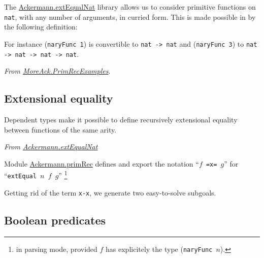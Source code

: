 The  \href{../theories/html/hydras.Ackermann.extEqualNat.html}{Ackermann.extEqualNat}
 library allows us to consider primitive functions on \texttt{nat}, with any number of arguments, in curried form. This is made possible in 
by the following definition:



For instance (\texttt{naryFunc 1}) is convertible to \texttt{nat -> nat} and (\texttt{naryFunc 3})
to \texttt{nat -> nat -> nat -> nat}.

\vspace{4pt}
\noindent
\emph{From \href{../theories/html/hydras.MoreAck.PrimRecExamples.html}{MoreAck.PrimRecExamples}}.





\subsection{Extensional equality}

Dependent types make it possible to define recursively extensional equality between functions of the same arity.

\vspace{4pt}
\noindent
\emph{From \href{../theories/html/hydras.Ackermann.extEqualNat.html}{Ackermann.extEqualNat}}


Module \href{../theories/html/hydras.Ackermann.primRec.html}{Ackermann.primRec} defines and export  the notation ``\texttt{$f$ =x= $g$}'' for ``\texttt{extEqual $n$ $f$ $g$}'' \footnote{in parsing mode, provided $f$ has explicitely the type (\texttt{naryFunc $n$}).}







  Getting rid of the term \texttt{x-x}, we generate two easy-to-solve subgoals.

\vspace{6pt}
\noindent


\subsection{Boolean predicates}


